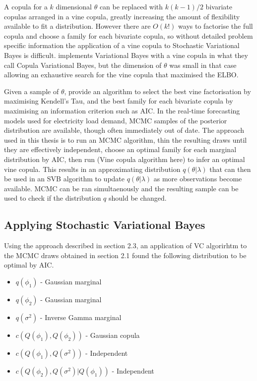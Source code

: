 \documentclass[12pt,a4paper]{article}%
\numberwithin{equation}{section}
\begin{document}
A copula for a $k$ dimensional $\theta$ can be replaced with $k(k-1)/2$ bivariate copulas arranged in a vine copula, greatly increasing the amount of flexibility available to fit a distribution. However there are $O(k!)$ ways to factorise the full copula and choose a family for each bivariate copula, so without detailed problem specific information the application of a vine copula to Stochastic Variational Bayes is difficult. \citet{Tran2015} implements Variational Bayes with a vine copula in what they call Copula Variational Bayes, but the dimension of $\theta$ was small in that case allowing an exhaustive search for the vine copula that maximised the ELBO. 

Given a sample of $\theta$, \citet{Diimann2013} provide an algorithm to select the best vine factorisation by maximising Kendell's Tau, and the best family for each bivariate copula by maximising an information criterion such as AIC. In the real-time forecasting models used for electricity load demand, MCMC samples of the posterior distribution are available, though often immediately out of date. The approach used in this thesis is to run an MCMC algorithm, thin the resulting draws until they are effectively independent, choose an optimal family for each marginal distribution by AIC, then run (Vine copula algorithm here) to infer an optimal vine copula. This results in an approximating distribution $q(\theta | \lambda)$ that can then be used in an SVB algorithm to update $q(\theta | \lambda)$ as more observations become available. MCMC can be ran simultaenously and the resulting sample can be used to check if the distribution $q$ should be changed. 

\subsection{Applying Stochastic Variational Bayes}

Using the approach described in section 2.3, an application of VC algorirhtm to the MCMC draws obtained in section 2.1 found the following distribution to be optimal by AIC.

\begin{itemize}
\item $q(\phi_1)$ - Gaussian marginal
\item $q(\phi_2)$ - Gaussian marginal
\item $q(\sigma^2)$ - Inverse Gamma marginal
\item $c(Q(\phi_1), Q(\phi_2))$ - Gaussian copula
\item $c(Q(\phi_1), Q(\sigma^2))$ - Independent
\item $c(Q(\phi_2), Q(\sigma^2) | Q(\phi_1))$ - Independent
\end{itemize}
\end{document}
